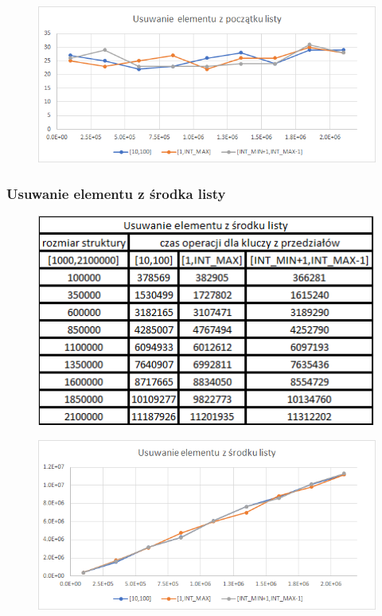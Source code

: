 \documentclass{article}
\begin{document}
\begin{figure}[h!]
\includegraphics[width=11.3cm]{images/list_usu_pocz_w.png}
\end{figure}

\newpage


\subsubsection*{Usuwanie elementu z środka listy}

\begin{figure}[h!]

\includegraphics{images/list_usuwanie_srodek_abc.png}

\end{figure}

\begin{figure}[h!]
\includegraphics[width=11.3cm]{images/list_usu_srodek_w.png}
\end{figure}
\end{document}
